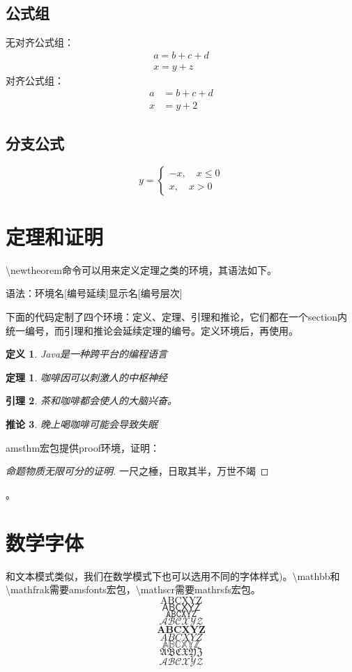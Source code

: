 \documentclass[UTF8]{article}
\begin{document}
\subsection{公式组}
无对齐公式组：\begin{gather}
	a=b+c+d\\
	x=y+z
\end{gather}
对齐公式组：
\begin{align}
	a &=b+c+d\\x &=y+2
\end{align}

\subsection{分支公式}
\[
y = \begin{cases}
	-x,\quad x\leq 0\\x,\quad x >0
\end{cases}
\]

\section{定理和证明}
\textbackslash newtheorem命令可以用来定义定理之类的环境，其语法如下。

语法：{环境名}[编号延续]{显示名}[编号层次]

下面的代码定制了四个环境：定义、定理、引理和推论，它们都在一个section内统一编号，而引理和推论会延续定理的编号。定义环境后，再使用。
\newtheorem{definition}{定义}[section]
\newtheorem{theorem}{定理}[section]
\newtheorem{lemma}[theorem]{引理}
\newtheorem{corollary}[theorem]{推论}
\begin{definition}
	Java是一种跨平台的编程语言
\end{definition}
\begin{theorem}
咖啡因可以刺激人的中枢神经
\end{theorem}
\begin{lemma}
茶和咖啡都会使人的大脑兴奋。
\end{lemma}
\begin{corollary}
	晚上喝咖啡可能会导致失眠
\end{corollary}
amsthm宏包提供proof环境，证明：
\begin{proof}[命题物质无限可分的证明]一尺之棰，日取其半，万世不竭\end{proof}。

\section{数学字体}
和文本模式类似，我们在数学模式下也可以选用不同的字体样式)。\textbackslash mathbb和\textbackslash mathfrak需要amsfonts宏包，\textbackslash mathscr需要mathrsfs宏包。
$$\mathrm{ABCXYZ}$$
\[\mathsf{ABCXYZ}\]
$$\mathtt{ABCXYZ}$$
\[\mathcal{ABCXYZ}\]
$$\mathbf{ABCXYZ}$$
\[\mathit{ABCXYZ}\]
\[\mathbb{ABCXYZ}\]
$$\mathfrak{ABCXYZ}$$
\[\mathscr{ABCXYZ}\]
\end{document}
